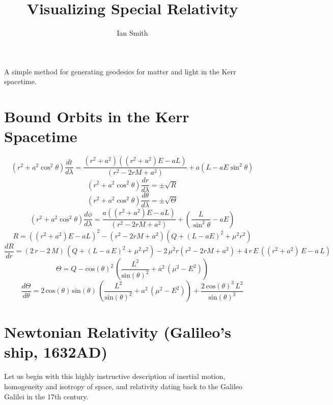 \documentclass[11pt]{article}
\title{\textbf{Visualizing Special Relativity}}
\author{Ian Smith}
\date{}
\begin{document}
\maketitle

\abstract
A simple method for generating geodesics for matter and light in the Kerr spacetime.

\section{Bound Orbits in the Kerr Spacetime}

$$
(r^2 + a^2 \cos^2\theta) \frac{d t}{d \lambda} = \frac{(r^2 + a^2) ((r^2 + a^2) E - aL)} {({r}^{2} - 2rM  + {a}^{2})} + a(L - aE \sin^2 \theta)
$$
$$
(r^2 + a^2 \cos^2\theta) \frac{d r}{d \lambda} = \pm \sqrt R
$$
$$
(r^2 + a^2 \cos^2\theta) \frac{d \theta}{d \lambda} = \pm \sqrt \Theta
$$
$$
(r^2 + a^2 \cos^2\theta) \frac{d \phi}{d \lambda}= \frac{a ((r^2 + a^2) E - aL)} {({r}^{2} - 2rM  + {a}^{2})} + (\frac {L} {\sin^2 \theta} -aE)
$$
$$
R = ((r^2 + a^2) E - aL)^2 - (r^2 - 2rM  + a^{2}) ( Q+{\left( L - aE\right) }^{2}+{\mu}^{2}{r}^{2})
$$
$$
\frac{d R}{d r} = \left( 2\,r - 2\,M\right) \,\left( Q+{\left( L - a\,E\right) }^{2}+{\mu}^{2}\,{r}^{2}\right) - 2\,{\mu}^{2}r({r}^{2} - 2rM  + {a}^{2}) +4\,r\,E\,\left( \left( {r}^{2}+{a}^{2}\right) \,E - a\,L\right)
$$
$$
\Theta=Q - {\mathrm{cos}\left( \theta\right) }^{2}\,\left( \frac{{L}^{2}}{{\mathrm{sin}\left( \theta\right) }^{2}}+{a}^{2}\,\left( {\mu}^{2} - {E}^{2}\right) \right)
$$
$$
\frac{d \Theta}{d \theta} = 2\,\mathrm{cos}\left( \theta\right) \,\mathrm{sin}\left( \theta\right) \,\left( \frac{{L}^{2}}{{\mathrm{sin}\left( \theta\right) }^{2}}+{a}^{2}\,\left( {\mu}^{2} - {E}^{2}\right) \right) +\frac{2\,{\mathrm{cos}\left( \theta\right) }^{3}\,{L}^{2}}{{\mathrm{sin}\left( \theta\right) }^{3}}
$$

\section{Newtonian Relativity (Galileo's ship, 1632AD)}

Let us begin with this highly instructive description of inertial motion, homogeneity and isotropy of space, and relativity dating back to the Galileo Galilei in the 17th century.
\end{document}

